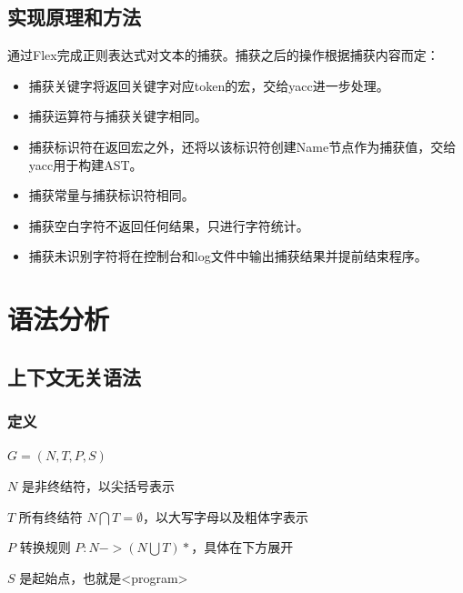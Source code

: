 \documentclass{article}
\begin{document}
\subsection{实现原理和方法}
\par 通过Flex完成正则表达式对文本的捕获。捕获之后的操作根据捕获内容而定：
\begin{itemize}
  \item 捕获关键字将返回关键字对应token的宏，交给yacc进一步处理。
  \item 捕获运算符与捕获关键字相同。
  \item 捕获标识符在返回宏之外，还将以该标识符创建Name节点作为捕获值，交给yacc用于构建AST。
  \item 捕获常量与捕获标识符相同。
  \item 捕获空白字符不返回任何结果，只进行字符统计。
  \item 捕获未识别字符将在控制台和log文件中输出捕获结果并提前结束程序。
\end{itemize}

\newpage
\section{语法分析}
\subsection{上下文无关语法}
\subsubsection{定义}
\par $G = (N, T, P, S) $
\par $N$ 是非终结符，以尖括号表示
\par $T$ 所有终结符 $N \bigcap T = \emptyset $，以大写字母以及粗体字表示
\par $P$ 转换规则 $P: N -> (N \bigcup T)*$，具体在下方展开
\par $S$ 是起始点，也就是<program>
\end{document}
